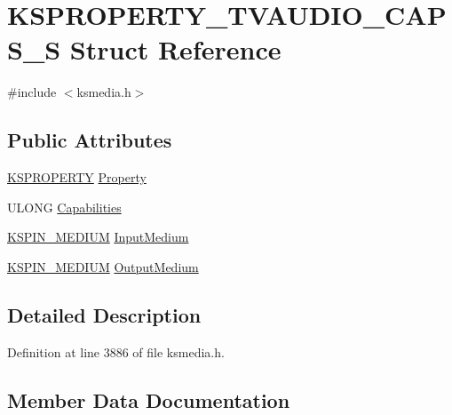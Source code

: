 \hypertarget{struct_k_s_p_r_o_p_e_r_t_y___t_v_a_u_d_i_o___c_a_p_s___s}{}\section{K\+S\+P\+R\+O\+P\+E\+R\+T\+Y\+\_\+\+T\+V\+A\+U\+D\+I\+O\+\_\+\+C\+A\+P\+S\+\_\+S Struct Reference}
\label{struct_k_s_p_r_o_p_e_r_t_y___t_v_a_u_d_i_o___c_a_p_s___s}


{\ttfamily \#include $<$ksmedia.\+h$>$}

\subsection*{Public Attributes}
\begin{DoxyCompactItemize}
\item 
\hyperlink{ks_8h_a4392f77c74e868d813d46c39ada4d660}{K\+S\+P\+R\+O\+P\+E\+R\+TY} \hyperlink{struct_k_s_p_r_o_p_e_r_t_y___t_v_a_u_d_i_o___c_a_p_s___s_a47dc163fb700d2d1fea9ce32939f6041}{Property}
\item 
U\+L\+O\+NG \hyperlink{struct_k_s_p_r_o_p_e_r_t_y___t_v_a_u_d_i_o___c_a_p_s___s_a1f67a9c12ae96b7885b7c2d51208335e}{Capabilities}
\item 
\hyperlink{ks_8h_a1e8ded652cd6544c903137c8e662d69f}{K\+S\+P\+I\+N\+\_\+\+M\+E\+D\+I\+UM} \hyperlink{struct_k_s_p_r_o_p_e_r_t_y___t_v_a_u_d_i_o___c_a_p_s___s_af8c98b92b924f1eaaf7e0967e21dee30}{Input\+Medium}
\item 
\hyperlink{ks_8h_a1e8ded652cd6544c903137c8e662d69f}{K\+S\+P\+I\+N\+\_\+\+M\+E\+D\+I\+UM} \hyperlink{struct_k_s_p_r_o_p_e_r_t_y___t_v_a_u_d_i_o___c_a_p_s___s_aaa516bed97ac1ac347eaede03625c1a4}{Output\+Medium}
\end{DoxyCompactItemize}


\subsection{Detailed Description}


Definition at line 3886 of file ksmedia.\+h.



\subsection{Member Data Documentation}
